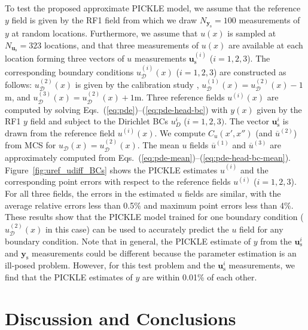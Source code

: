 \documentclass{agujournal2019}
\begin{document}
To test the proposed approximate PICKLE model, we assume that the reference $y$ field is given by the RF1 field from which we draw $N_{\mathbf{y}_{\mathrm{s}}}=100$ measurements of $y$ at random locations. Furthermore, we assume that $u(x)$ is sampled at $N_{\mathbf{u}_{\mathrm{s}}}=323$ locations, and that three measurements of $u(x)$ are available at each location forming three vectors of $u$ measurements $\mathbf{u}_\mathrm{s}^{(i)}$ ($i=1,2,3$).
The corresponding boundary conditions $u_\mathcal{D}^{(i)}(x)$ ($i=1,2,3$)  are constructed as follows: $u_\mathcal{D}^{(2)}(x)$ is given by the calibration study \citep{cole2001transient}, $u_\mathcal{D}^{(1)}(x) = u_\mathcal{D}^{(2)}(x) - 1$m, and $u_\mathcal{D}^{(3)}(x) = u_\mathcal{D}^{(2)}(x) + 1$m.
Three reference fields $u^{(i)}(x)$ are computed by solving Eqs.~(\ref{eq:pde})--(\ref{eq:pde-head-bc}) with $y(x)$ given by the RF1 $y$ field and subject to the Dirichlet BCs ${u}_D^{i}$ ($i=1,2,3)$.
The vector $\mathbf{u}_\mathrm{s}^{i}$ is drawn from the reference field $u^{(i)}(x)$. 
We compute $C_u(x',x'')$ (and $\overline{u}^{(2)}$) from MCS for $u_\mathcal{D}(x) = u_\mathcal{D}^{(2)}(x)$. 
The mean $u$ fields $\overline{u}^{(1)}$ and $\overline{u}^{(3)}$ are approximately computed from Eqs.~(\ref{eq:pde-mean})--(\ref{eq:pde-head-bc-mean}).
Figure~\ref{fig:uref_udiff_BCs} shows the PICKLE estimates $\hat{u}^{(i)}$ and the corresponding point errors with respect to the reference fields $u^{(i)}$ ($i=1,2,3$).
For all three fields, the errors in the estimated $u$ fields are similar, with the average relative errors less than 0.5\% and maximum point errors less than 4\%. These results show that the PICKLE model trained for one boundary condition ( $u_\mathcal{D}^{(2)}(x)$ in this case) can be used to accurately predict the $u$ field for any boundary condition. 
Note that in general, the PICKLE estimate of $y$ from the $\mathbf{u}_\mathrm{s}^{i}$ and $\mathbf{y}_\mathrm{s}$ measurements could be different because the parameter estimation is an ill-posed problem.
However, for this test problem and the $\mathbf{u}_\mathrm{s}^{i}$ measurements, we find that the PICKLE estimates of $y$ are within 0.01\% of each other. 


\section{Discussion and Conclusions}
\label{sec:conclusions}
\end{document}
